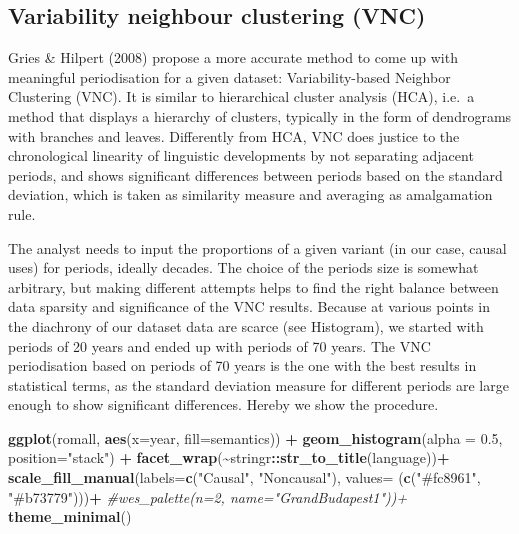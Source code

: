\documentclass[
]{article}
\newenvironment{Shaded}{\begin{snugshade}}{\end{snugshade}}
\newcommand{\AttributeTok}[1]{\textcolor[rgb]{0.13,0.29,0.53}{#1}}
\newcommand{\CommentTok}[1]{\textcolor[rgb]{0.56,0.35,0.01}{\textit{#1}}}
\newcommand{\FloatTok}[1]{\textcolor[rgb]{0.00,0.00,0.81}{#1}}
\newcommand{\FunctionTok}[1]{\textcolor[rgb]{0.13,0.29,0.53}{\textbf{#1}}}
\newcommand{\NormalTok}[1]{#1}
\newcommand{\SpecialCharTok}[1]{\textcolor[rgb]{0.81,0.36,0.00}{\textbf{#1}}}
\newcommand{\StringTok}[1]{\textcolor[rgb]{0.31,0.60,0.02}{#1}}
\begin{document}
\subsection{Variability neighbour clustering
(VNC)}\label{variability-neighbour-clustering-vnc}

Gries \& Hilpert (2008) propose a more accurate method to come up with
meaningful periodisation for a given dataset: Variability-based Neighbor
Clustering (VNC). It is similar to hierarchical cluster analysis (HCA),
i.e.~a method that displays a hierarchy of clusters, typically in the
form of dendrograms with branches and leaves. Differently from HCA, VNC
does justice to the chronological linearity of linguistic developments
by not separating adjacent periods, and shows significant differences
between periods based on the standard deviation, which is taken as
similarity measure and averaging as amalgamation rule.

The analyst needs to input the proportions of a given variant (in our
case, causal uses) for periods, ideally decades. The choice of the
periods size is somewhat arbitrary, but making different attempts helps
to find the right balance between data sparsity and significance of the
VNC results. Because at various points in the diachrony of our dataset
data are scarce (see Histogram), we started with periods of 20 years and
ended up with periods of 70 years. The VNC periodisation based on
periods of 70 years is the one with the best results in statistical
terms, as the standard deviation measure for different periods are large
enough to show significant differences. Hereby we show the procedure.

\begin{Shaded}
\begin{Highlighting}[]
\FunctionTok{ggplot}\NormalTok{(romall, }\FunctionTok{aes}\NormalTok{(}\AttributeTok{x=}\NormalTok{year, }\AttributeTok{fill=}\NormalTok{semantics)) }\SpecialCharTok{+}
  \FunctionTok{geom\_histogram}\NormalTok{(}\AttributeTok{alpha =} \FloatTok{0.5}\NormalTok{, }\AttributeTok{position=}\StringTok{"stack"}\NormalTok{) }\SpecialCharTok{+}
  \FunctionTok{facet\_wrap}\NormalTok{(}\SpecialCharTok{\textasciitilde{}}\NormalTok{stringr}\SpecialCharTok{::}\FunctionTok{str\_to\_title}\NormalTok{(language))}\SpecialCharTok{+}
  \FunctionTok{scale\_fill\_manual}\NormalTok{(}\AttributeTok{labels=}\FunctionTok{c}\NormalTok{(}\StringTok{"Causal"}\NormalTok{, }\StringTok{"Noncausal"}\NormalTok{), }\AttributeTok{values=}\NormalTok{ (}\FunctionTok{c}\NormalTok{(}\StringTok{"\#fc8961"}\NormalTok{, }\StringTok{"\#b73779"}\NormalTok{)))}\SpecialCharTok{+} \CommentTok{\#wes\_palette(n=2, name="GrandBudapest1"))+}
  \FunctionTok{theme\_minimal}\NormalTok{()}
\end{Highlighting}
\end{Shaded}
\end{document}
